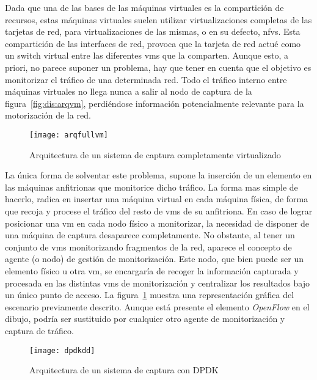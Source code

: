 Dada que una de las bases de las máquinas virtuales es la compartición de recursos, estas máquinas virtuales suelen utilizar virtualizaciones completas de las tarjetas de red, para virtualizaciones de las mismas, o en su defecto, \glspl{nfv}. Esta compartición de las interfaces de red, provoca que la tarjeta de red actué como un switch virtual entre las diferentes \glspl{vm} que la comparten. Aunque esto, a priori, no parece suponer un problema, hay que tener en cuenta que el objetivo es monitorizar el tráfico de una determinada red. Todo el tráfico interno entre máquinas virtuales no llega nunca a salir al nodo de captura de la figura~\ref{fig:dis:arqvm}, perdiéndose información potencialmente relevante para la motorización de la red.


\begin{figure}[!th]
\centering
\texttt{[image: arqfullvm]}
\caption{Arquitectura de un sistema de captura completamente virtualizado}
\label{fig:dis:arqfullvm}
\end{figure}

La única forma de solventar este problema, supone la inserción de un elemento en las máquinas anfitrionas que monitorice dicho tráfico. La forma mas simple de hacerlo, radica en insertar una máquina virtual en cada máquina física, de forma que recoja y procese el tráfico del resto de \glspl{vm} de su anfitriona.
En caso de lograr posicionar una \gls{vm} en cada nodo físico a monitorizar, la necesidad de disponer de una máquina de captura desaparece completamente. No obstante, al tener un conjunto de \glspl{vm} monitorizando fragmentos de la red, aparece el concepto de agente (o nodo) de gestión de monitorización. Este nodo, que bien puede ser un elemento físico u otra \gls{vm}, se encargaría de recoger la información capturada y procesada en las distintas \glspl{vm} de monitorización y centralizar los resultados bajo un único punto de acceso. La figura~\ref{fig:dis:arqfullvm} muestra una representación gráfica del escenario previamente descrito. Aunque está presente el elemento \textit{OpenFlow} en el dibujo, podría ser sustituido por cualquier otro agente de monitorización y captura de tráfico.



\begin{figure}[!th]
\centering
\texttt{[image: dpdkdd]}
\caption{Arquitectura de un sistema de captura con DPDK}
\label{fig:dis:dpdkdd}
\end{figure}


